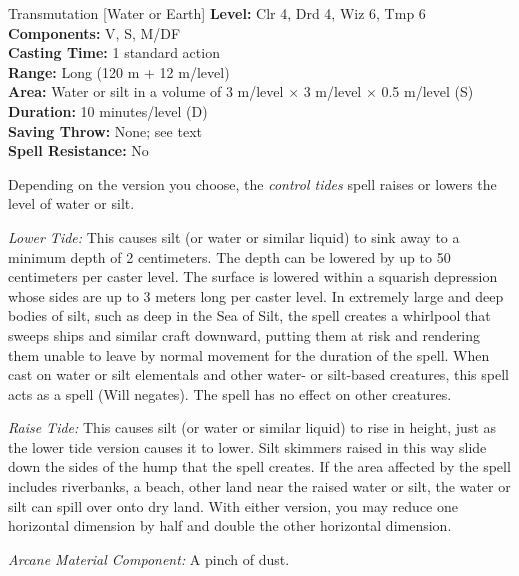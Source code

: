 {Transmutation [Water or Earth]}
{
	\textbf{Level:}
	Clr 4, Drd 4, Wiz 6, Tmp 6\\
	\textbf{Components:}
	V, S, M/DF\\
	\textbf{Casting Time:}
	1 standard action\\
	\textbf{Range:}
	Long (120 m + 12 m/level)\\
	\textbf{Area:}
	Water or silt in a volume of 3 m/level $\times$ 3 m/level $\times$ 0.5 m/level (S)\\
	\textbf{Duration:}
	10 minutes/level (D)\\
	\textbf{Saving Throw:}
	None; see text\\
	\textbf{Spell Resistance:}
	No\\
}
{
	Depending on the version you choose, the \emph{control tides} spell raises or lowers the level of water or silt.

	\textit{Lower Tide:} This causes silt (or water or similar liquid) to sink away to a minimum depth of 2 centimeters. The depth can be lowered by up to 50 centimeters per caster level. The surface is lowered within a squarish depression whose sides are up to 3 meters long per caster level. In extremely large and deep bodies of silt, such as deep in the Sea of Silt, the spell creates a whirlpool that sweeps ships and similar craft downward, putting them at risk and rendering them unable to leave by normal movement for the duration of the spell. When cast on water or silt elementals and other water- or silt-based creatures, this spell acts as a  spell (Will negates). The spell has no effect on other creatures.

	\textit{Raise Tide:} This causes silt (or water or similar liquid) to rise in height, just as the lower tide version causes it to lower. Silt skimmers raised in this way slide down the sides of the hump that the spell creates. If the area affected by the spell includes riverbanks, a beach, other land near the raised water or silt, the water or silt can spill over onto dry land. With either version, you may reduce one horizontal dimension by half and double the other horizontal dimension.

	\textit{Arcane Material Component:} A pinch of dust.
}
